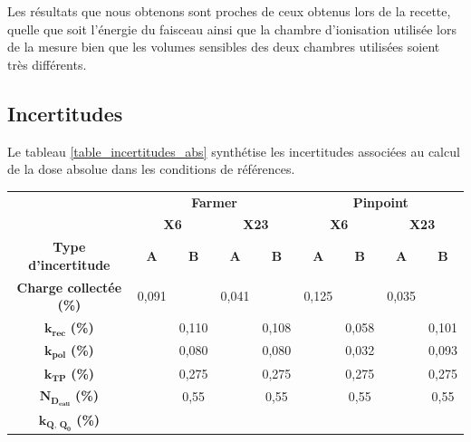 \documentclass{article}
\begin{document}
Les résultats que nous obtenons sont proches de ceux obtenus lors de la recette, quelle que soit l'énergie du faisceau ainsi que la chambre d'ionisation utilisée lors de la mesure bien que les volumes sensibles des deux chambres utilisées soient très différents.

\newpage
\subsection{Incertitudes}

Le tableau \ref*{table_incertitudes_abs} synthétise les incertitudes associées au calcul de la dose absolue dans les conditions de références.

\begin{table}[h]
  \centering
  \begin{tabular}{c|cccc|cccc|}
  \cline{2-9}
   &
    \multicolumn{4}{c|}{\textbf{Farmer}} &
    \multicolumn{4}{c|}{\textbf{Pinpoint}} \\ \cline{2-9} 
   &
    \multicolumn{2}{c|}{\textbf{X6}} &
    \multicolumn{2}{c|}{\textbf{X23}} &
    \multicolumn{2}{c|}{\textbf{X6}} &
    \multicolumn{2}{c|}{\textbf{X23}} \\ \hline
  \multicolumn{1}{|c|}{\textbf{Type d'incertitude}} &
    \textbf{A} &
    \multicolumn{1}{c|}{\textbf{B}} &
    \textbf{A} &
    \textbf{B} &
    \textbf{A} &
    \multicolumn{1}{c|}{\textbf{B}} &
    \textbf{A} &
    \textbf{B} \\
  \multicolumn{1}{|c|}{\textbf{Charge collectée (\%)}} &
    0,091 &
    \multicolumn{1}{c|}{} &
    0,041 &
     &
    0,125 &
    \multicolumn{1}{c|}{} &
    0,035 &
     \\
  \multicolumn{1}{|c|}{$\mathbf{k_{rec}}$ \textbf{(\%)}} &
     &
    \multicolumn{1}{c|}{0,110} &
     &
    0,108 &
     &
    \multicolumn{1}{c|}{0,058} &
     &
    0,101 \\
  \multicolumn{1}{|c|}{$\mathbf{k_{pol}}$ \textbf{(\%)}} &
     &
    \multicolumn{1}{c|}{0,080} &
     &
    0,080 &
     &
    \multicolumn{1}{c|}{0,032} &
     &
    0,093 \\
  \multicolumn{1}{|c|}{$\mathbf{k_{TP}}$ \textbf{(\%)}} &
     &
    \multicolumn{1}{c|}{0,275} &
     &
    0,275 &
     &
    \multicolumn{1}{c|}{0,275} &
     &
    0,275 \\
  \multicolumn{1}{|c|}{$\mathbf{N_{D_{eau}}}$ \textbf{(\%)}} &
     &
    \multicolumn{1}{c|}{0,55} &
     &
    0,55 &
     &
    \multicolumn{1}{c|}{0,55} &
     &
    0,55 \\
  \multicolumn{1}{|c|}{$\mathbf{k_{Q,\, Q_0}}$ \textbf{(\%)}} &

\end{tabular}
\end{table}
\end{document}
